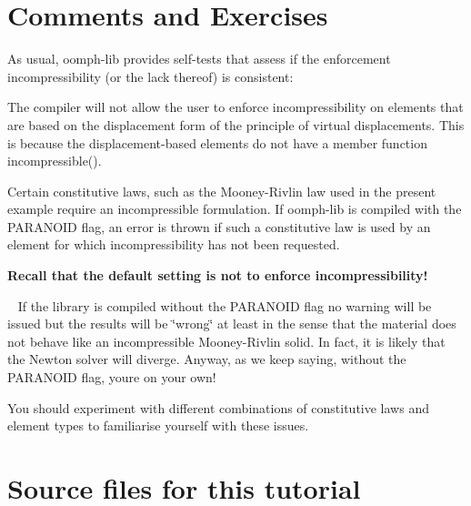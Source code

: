 \hypertarget{index_comm_ex}{}\section{Comments and Exercises}\label{index_comm_ex}
As usual, {\ttfamily oomph-\/lib} provides self-\/tests that assess if the enforcement incompressibility (or the lack thereof) is consistent\+:
\begin{DoxyItemize}
\item The compiler will not allow the user to enforce incompressibility on elements that are based on the displacement form of the principle of virtual displacements. This is because the displacement-\/based elements do not have a member function {\ttfamily incompressible()}. ~\newline
~\newline

\item Certain constitutive laws, such as the Mooney-\/\+Rivlin law used in the present example require an incompressible formulation. If {\ttfamily oomph-\/lib} is compiled with the {\ttfamily P\+A\+R\+A\+N\+O\+ID} flag, an error is thrown if such a constitutive law is used by an element for which incompressibility has not been requested. ~\newline
~\newline
 \begin{center} {\bfseries Recall that the default setting is not to enforce incompressibility!} \end{center}  ~\newline
 If the library is compiled without the {\ttfamily P\+A\+R\+A\+N\+O\+ID} flag no warning will be issued but the results will be \char`\"{}wrong\char`\"{} at least in the sense that the material does not behave like an incompressible Mooney-\/\+Rivlin solid. In fact, it is likely that the Newton solver will diverge. Anyway, as we keep saying, without the {\ttfamily P\+A\+R\+A\+N\+O\+ID} flag, you\textquotesingle{}re on your own! ~\newline
~\newline

\end{DoxyItemize}You should experiment with different combinations of constitutive laws and element types to familiarise yourself with these issues.



 

\hypertarget{index_sources}{}\section{Source files for this tutorial}\label{index_sources}

